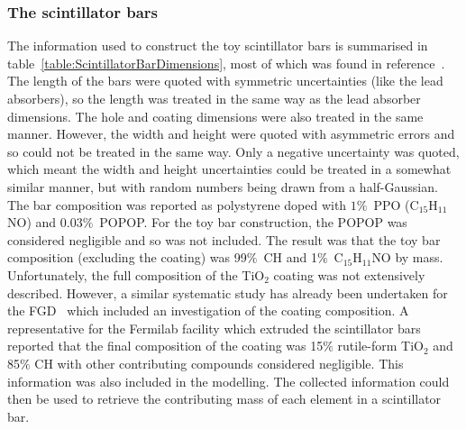 \subsubsection{The scintillator bars}
\label{subsubsec:ECalMassSctintillatorBars}
The information used to construct the toy scintillator bars is summarised in table~\ref{table:ScintillatorBarDimensions}, most of which was found in reference~\cite{1748-0221-8-10-P10019}.  The length of the bars were quoted with symmetric uncertainties (like the lead absorbers), so the length was treated in the same way as the lead absorber dimensions.  The hole and coating dimensions were also treated in the same manner.  However, the width and height were quoted with asymmetric errors and so could not be treated in the same way.  Only a negative uncertainty was quoted, which meant the width and height uncertainties could be treated in a somewhat similar manner, but with random numbers being drawn from a half-Gaussian.  The bar composition was reported as polystyrene doped with $1\%$~PPO (C$_{15}$H$_{11}$NO) and $0.03\%$~POPOP.  For the toy bar construction, the POPOP was considered negligible and so was not included.  The result was that the toy bar composition (excluding the coating) was 99$\%$~CH and 1$\%$~C$_{15}$H$_{11}$NO by mass.  Unfortunately, the full composition of the TiO$_2$ coating was not extensively described.  However, a similar systematic study has already been undertaken for the FGD~\cite{FGDMassTN} which included an investigation of the coating composition.  A representative for the Fermilab facility which extruded the scintillator bars reported that the final composition of the coating was 15$\%$ rutile-form TiO$_2$ and 85$\%$ CH with other contributing compounds considered negligible.  This information was also included in the modelling.  The collected information could then be used to retrieve the contributing mass of each element in a scintillator bar.
